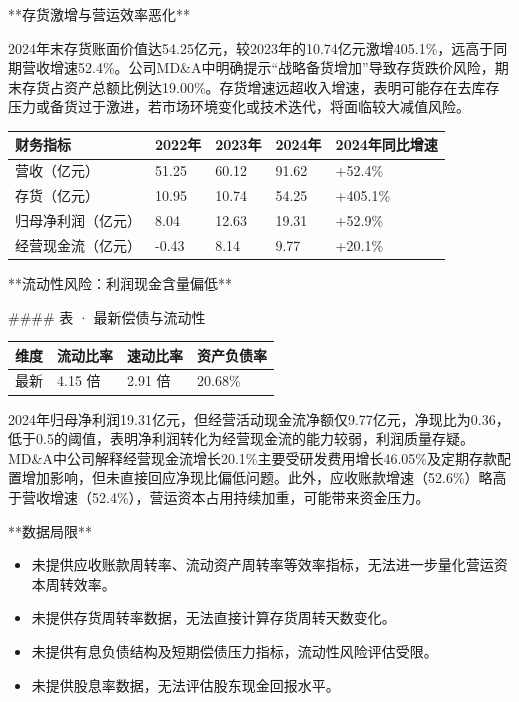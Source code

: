 \documentclass[12pt,a4paper]{article}
\begin{document}
**存货激增与营运效率恶化**

2024年末存货账面价值达54.25亿元，较2023年的10.74亿元激增405.1\%，远高于同期营收增速52.4\%。公司MD\&A中明确提示“战略备货增加”导致存货跌价风险，期末存货占资产总额比例达19.00\%。存货增速远超收入增速，表明可能存在去库存压力或备货过于激进，若市场环境变化或技术迭代，将面临较大减值风险。

\begin{table}[htbp]
\centering
\begin{tabular}{lllll}
\toprule
财务指标 & 2022年 & 2023年 & 2024年 & 2024年同比增速 \\
\midrule
营收（亿元） & 51.25 & 60.12 & 91.62 & +52.4\% \\
存货（亿元） & 10.95 & 10.74 & 54.25 & +405.1\% \\
归母净利润（亿元） & 8.04 & 12.63 & 19.31 & +52.9\% \\
经营现金流（亿元） & -0.43 & 8.14 & 9.77 & +20.1\% \\
\bottomrule
\end{tabular}
\end{table}


**流动性风险：利润现金含量偏低**

\#\#\#\# 表 · 最新偿债与流动性

\begin{table}[htbp]
\centering
\begin{tabular}{llll}
\toprule
维度 & 流动比率 & 速动比率 & 资产负债率 \\
\midrule
最新 & 4.15 倍 & 2.91 倍 & 20.68\% \\
\bottomrule
\end{tabular}
\end{table}


2024年归母净利润19.31亿元，但经营活动现金流净额仅9.77亿元，净现比为0.36，低于0.5的阈值，表明净利润转化为经营现金流的能力较弱，利润质量存疑。MD\&A中公司解释经营现金流增长20.1\%主要受研发费用增长46.05\%及定期存款配置增加影响，但未直接回应净现比偏低问题。此外，应收账款增速（52.6\%）略高于营收增速（52.4\%），营运资本占用持续加重，可能带来资金压力。

**数据局限**
\begin{itemize}
\item 未提供应收账款周转率、流动资产周转率等效率指标，无法进一步量化营运资本周转效率。
\item 未提供存货周转率数据，无法直接计算存货周转天数变化。
\item 未提供有息负债结构及短期偿债压力指标，流动性风险评估受限。
\item 未提供股息率数据，无法评估股东现金回报水平。
\end{itemize}
\end{document}
